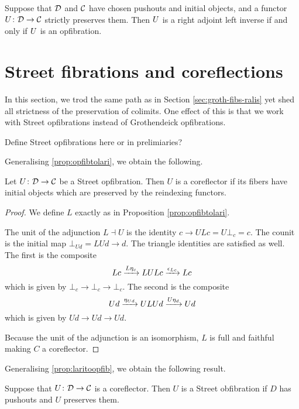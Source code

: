 \documentclass{amsart}
\begin{document}
\begin{thm}\label{thm:mainthm}
Suppose that $\mathcal{D}$ and $\mathcal{C}$ have chosen pushouts and initial objects, and a functor $U\colon\mathcal{D}\to\mathcal{C}$ strictly preserves them. Then $U$ is a right adjoint left inverse if and only if $U$ is an opfibration.
\end{thm}

\section{Street fibrations and coreflections}\label{Streetfibs}

In this section, we trod the same path as in
Section \ref{sec:groth-fibs-ralis} yet shed all
strictness of the preservation of colimits.  One
effect of this is that we work with Street
opfibrations instead of Grothendeick
opfibrations.

{\daniel Define Street opfibrations here or in prelimiaries?}

Generalising \cref{prop:opfibtolari}, we obtain
the following. 

\begin{prop}
  \label{thm:street-opfib-to-corefl}
  Let $ U \colon \mathcal{D} \to \mathcal{C} $ be a Street
  opfibration. Then $ U $ is a coreflector if its
  fibers have initial objects which are preserved
  by the reindexing functors.
\end{prop}

\begin{proof}
  We define $ L $ exactly as in Proposition
  \ref{prop:opfibtolari}. 

  The unit of the adjunction $ L \dashv U $ is the
  identity $ c \to ULc = U\bot_c = c $.  The
  counit is the initial map $ \bot_{Ud} = LUd \to
  d $.  The triangle identities are satisfied as
  well. The first is the composite
  \[
    Lc \xrightarrow{L\eta_c} LULc \xrightarrow{\epsilon_{Lc}} Lc
  \]
  which is given by $ \bot_c \to \bot_c \to \bot_c
  $.  The second is the composite
  \[
    Ud \xrightarrow{\eta_{Ud}} ULUd \xrightarrow{U\eta_d} Ud
  \]
  which is given by $ Ud \to Ud \to Ud $.

  Because the unit of the adjunction is an
  isomorphism, $ L $ is full and faithful
  \cite[{Prop.~1.3}]{gabrielzisman} making $ C $ a
  coreflector.
\end{proof}

Generalising \cref{prop:laritoopfib}, we obtain the following result.

\begin{prop}
  \label{thm:corefl-to-street-obfib}
  Suppose that $ U \colon \mathcal{D} \to \mathcal{C} $ is a
  coreflector. Then $ U $ is a Street obfibration
  if $ D $ has pushouts and $ U $ preserves them.
\end{prop}
\end{document}
